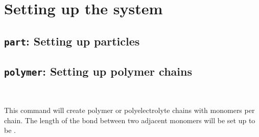 \chapter{Setting up the system}
\label{chap:setup}

\section{\texttt{part}: Setting up particles}
\label{sec:part}


\section{\texttt{polymer}: Setting up polymer chains}
\label{sec:polymer}

{ 
  \\{}
}

This command will create  polymer or
polyelectrolyte chains with  monomers per
chain. The length of the bond between two adjacent monomers will be
set up to be .

